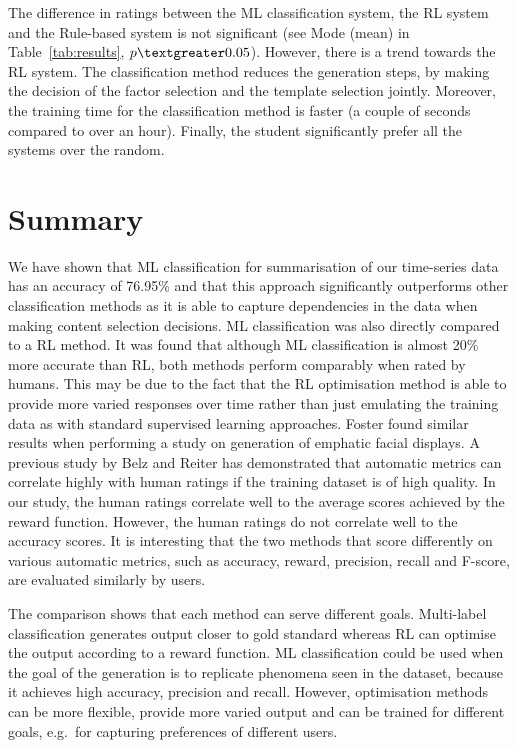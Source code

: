 \documentclass[11pt]{article}
\begin{document}
The difference in ratings between the ML classification system,
the RL system and the Rule-based system is not significant (see Mode
(mean) in Table~\ref{tab:results}, $p\textgreater 0.05$). 
However, there is a trend towards the RL system. 
The classification method reduces the 
generation steps, by making the decision of the factor selection and the template selection jointly. Moreover, 
the training time for the classification method is faster (a couple of
seconds compared to over an hour). Finally, the student significantly prefer all the systems over the random.

\section{Summary}

We have shown that ML classification for 
summarisation of our time-series data has an accuracy of 76.95\% and that this approach significantly outperforms other classification methods as it is able
to capture dependencies in the data when making content selection decisions. 
ML classification was also directly compared to a RL method. It was found that although ML classification 
is almost 20\% more accurate than RL, both methods perform comparably when rated 
by humans. This may be due to the fact that the RL optimisation
method is able to provide more varied responses over time rather than
just emulating the training data as with standard supervised learning approaches. 
Foster  found similar results when performing a study on generation of 
emphatic facial displays.
A previous study by Belz and Reiter  has demonstrated that automatic metrics can correlate highly 
with human ratings if the training dataset is of high quality. In our study, the human ratings correlate well to the average scores achieved by the reward function. However, the human ratings do not correlate well to the accuracy scores. %
It is interesting that the two methods that score differently on various automatic metrics, such as accuracy, reward, precision, 
recall and F-score, are evaluated similarly by users. 

The comparison shows that each method can serve different goals. Multi-label classification generates output closer to 
gold standard whereas RL can optimise the output according to a reward function. 
ML classification could be used when the goal of the generation is 
to replicate phenomena seen in the dataset, because it achieves high accuracy, precision and recall. 
However, optimisation methods can be more flexible, provide more
varied output and can be trained for different goals, 
e.g.\ for capturing preferences of different users. 
\end{document}
